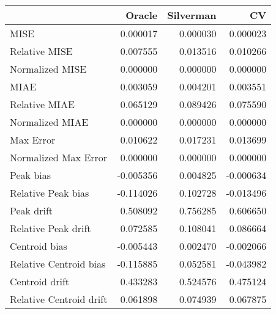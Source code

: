 \begin{tabular}{lrrr}
  \hline
 & Oracle & Silverman & CV \\ 
  \hline
MISE & 0.000017 & 0.000030 & 0.000023 \\ 
  Relative MISE & 0.007555 & 0.013516 & 0.010266 \\ 
  Normalized MISE & 0.000000 & 0.000000 & 0.000000 \\ 
  MIAE & 0.003059 & 0.004201 & 0.003551 \\ 
  Relative MIAE & 0.065129 & 0.089426 & 0.075590 \\ 
  Normalized MIAE & 0.000000 & 0.000000 & 0.000000 \\ 
  Max Error & 0.010622 & 0.017231 & 0.013699 \\ 
  Normalized Max Error & 0.000000 & 0.000000 & 0.000000 \\ 
  Peak bias & -0.005356 & 0.004825 & -0.000634 \\ 
  Relative Peak bias & -0.114026 & 0.102728 & -0.013496 \\ 
  Peak drift & 0.508092 & 0.756285 & 0.606650 \\ 
  Relative Peak drift & 0.072585 & 0.108041 & 0.086664 \\ 
  Centroid bias & -0.005443 & 0.002470 & -0.002066 \\ 
  Relative Centroid bias & -0.115885 & 0.052581 & -0.043982 \\ 
  Centroid drift & 0.433283 & 0.524576 & 0.475124 \\ 
  Relative Centroid drift & 0.061898 & 0.074939 & 0.067875 \\ 
   \hline
\end{tabular}
